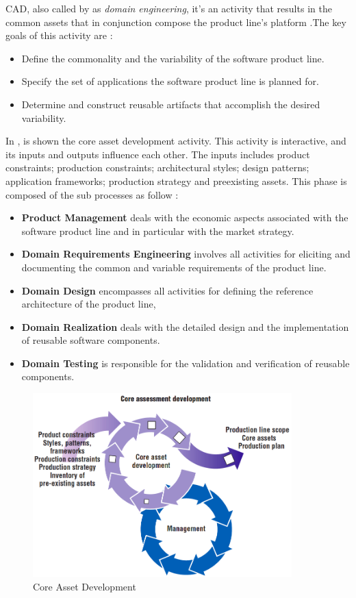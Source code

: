\acf{CAD}, also called by \citep{Pohl2005} as \textit{domain engineering}, it’s an activity that results in the common assets that in conjunction compose the product line’s platform \citep{clements2002software}.The key goals of this activity are \citep{Pohl2005}:
\begin{itemize}
\item Define the commonality and the variability of the software product line.
\item Specify the set of applications the software product line is planned for.
\item Determine and construct reusable artifacts that accomplish the desired variability.
\end{itemize}

In , is shown the core asset development activity. This activity is interactive, and its inputs and outputs influence each other. The inputs includes product constraints; production constraints; architectural styles; design patterns; application frameworks; production strategy and preexisting assets. 
This phase is composed of the sub processes as follow \citep{Pohl2005}: 
\begin{itemize}

\item \textbf{Product Management} deals with the economic aspects associated with the software product line and in particular with the market strategy.
\item \textbf{Domain Requirements Engineering} involves all activities for eliciting and documenting the common and variable requirements of the product line.
\item \textbf{Domain Design} encompasses all activities for defining the reference architecture of the product line, 
\item \textbf{Domain Realization} deals with the detailed design and the implementation of reusable software components.
\item \textbf{Domain Testing} is responsible for the validation and verification of reusable components. 
\end{itemize}

\begin{figure}[htp]
\begin{center}
  \includegraphics[width=10cm]{chapters/background/img/SPLcoreasserts.png}
  \caption[Core Asset Development]{Core Asset Development \citep{clements2002software}}
  \label{fg:spl-coreasset}
\end{center}
\end{figure}

